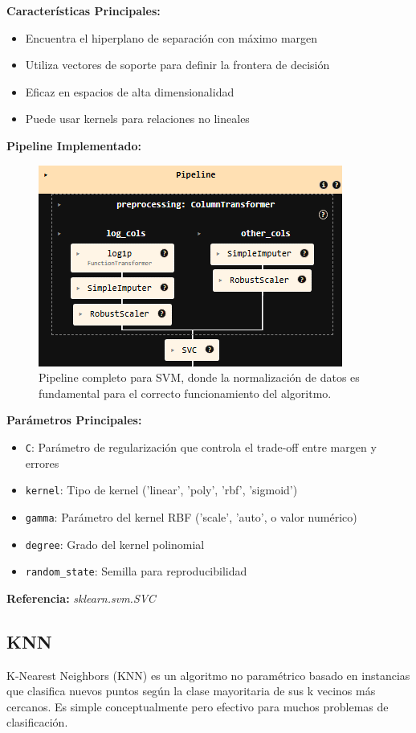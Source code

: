 \documentclass{article}
\begin{document}
\textbf{Características Principales:}
\begin{itemize}
    \item Encuentra el hiperplano de separación con máximo margen
    \item Utiliza vectores de soporte para definir la frontera de decisión
    \item Eficaz en espacios de alta dimensionalidad
    \item Puede usar kernels para relaciones no lineales
\end{itemize}

\textbf{Pipeline Implementado:}
\begin{figure}[H]
    \centering
    \includegraphics[width=0.4\linewidth]{pipeline_svm.png}
    \caption{Pipeline completo para SVM, donde la normalización de datos es fundamental para el correcto funcionamiento del algoritmo.}
    \label{fig:pipeline_svm}
\end{figure}

\textbf{Parámetros Principales:}
\begin{itemize}
    \item \texttt{C}: Parámetro de regularización que controla el trade-off entre margen y errores
    \item \texttt{kernel}: Tipo de kernel ('linear', 'poly', 'rbf', 'sigmoid')
    \item \texttt{gamma}: Parámetro del kernel RBF ('scale', 'auto', o valor numérico)
    \item \texttt{degree}: Grado del kernel polinomial
    \item \texttt{random\_state}: Semilla para reproducibilidad
\end{itemize}

\textbf{Referencia:} \textit{sklearn.svm.SVC} \cite{sklearn_svm}

\subsection{KNN}

K-Nearest Neighbors (KNN) es un algoritmo no paramétrico basado en instancias que clasifica nuevos puntos según la clase mayoritaria de sus k vecinos más cercanos. Es simple conceptualmente pero efectivo para muchos problemas de clasificación.
\end{document}
